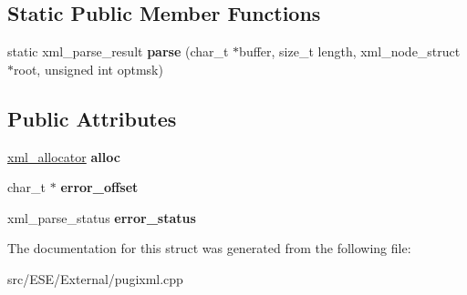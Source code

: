 \subsection*{Static Public Member Functions}
\begin{DoxyCompactItemize}
\item 
\hypertarget{structxml__parser_a116885dc8aaf5fcd025511def4605674}{static xml\-\_\-parse\-\_\-result {\bfseries parse} (char\-\_\-t $\ast$buffer, size\-\_\-t length, xml\-\_\-node\-\_\-struct $\ast$root, unsigned int optmsk)}\label{structxml__parser_a116885dc8aaf5fcd025511def4605674}

\end{DoxyCompactItemize}
\subsection*{Public Attributes}
\begin{DoxyCompactItemize}
\item 
\hypertarget{structxml__parser_a213cf019cbf45f5049acdcae296a2976}{\hyperlink{structxml__allocator}{xml\-\_\-allocator} {\bfseries alloc}}\label{structxml__parser_a213cf019cbf45f5049acdcae296a2976}

\item 
\hypertarget{structxml__parser_a2476a71cd7e67b3f4bdbcd1323524503}{char\-\_\-t $\ast$ {\bfseries error\-\_\-offset}}\label{structxml__parser_a2476a71cd7e67b3f4bdbcd1323524503}

\item 
\hypertarget{structxml__parser_a0555859911674e5a7a349447d6533383}{xml\-\_\-parse\-\_\-status {\bfseries error\-\_\-status}}\label{structxml__parser_a0555859911674e5a7a349447d6533383}

\end{DoxyCompactItemize}


The documentation for this struct was generated from the following file\-:\begin{DoxyCompactItemize}
\item 
src/\-E\-S\-E/\-External/pugixml.\-cpp\end{DoxyCompactItemize}
